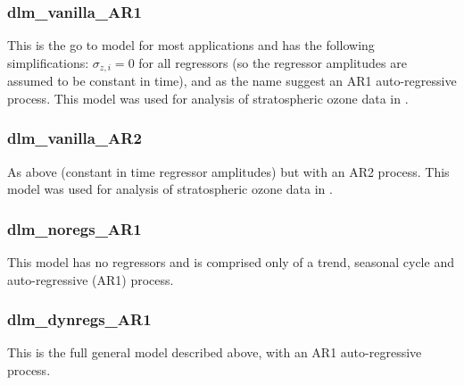 \documentclass[a4paper, oneside, final]{scrartcl}
\begin{document}
\subsubsection*{dlm\_vanilla\_AR1}
This is the go to model for most applications and has the following simplifications: $\sigma_{z,i} = 0$ for all regressors (so the regressor amplitudes are assumed to be constant in time), and as the name suggest an AR1 auto-regressive process. This model was used for analysis of stratospheric ozone data in \citet{ball2017}.
%
\subsubsection*{dlm\_vanilla\_AR2}
As above (constant in time regressor amplitudes) but with an AR2 process. This model was used for analysis of stratospheric ozone data in \citet{ball2018}.
%
\subsubsection*{dlm\_noregs\_AR1}
This model has no regressors and is comprised only of a trend, seasonal cycle and auto-regressive (AR1) process.
%
\subsubsection*{dlm\_dynregs\_AR1}
This is the full general model described above, with an AR1 auto-regressive process.
\end{document}
